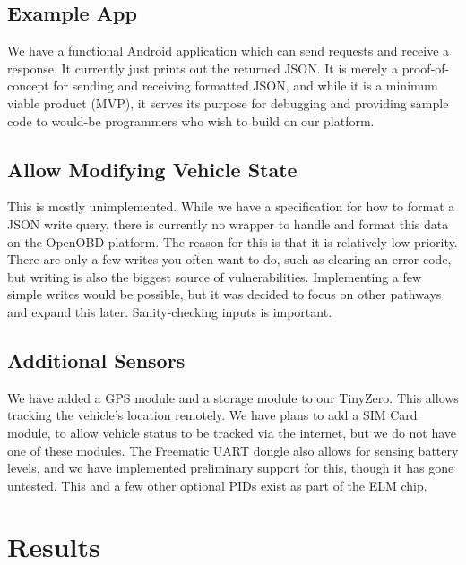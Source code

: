 \documentclass[10pt,letterpaper,unboxed,cm]{article}
\begin{document}
\subsection{Example App}

We have a functional Android application which can send requests and receive a response. It currently just prints out the returned JSON. It is merely a proof-of-concept for sending and receiving formatted JSON, and while it is a minimum viable product (MVP), it serves its purpose for debugging and providing sample code to would-be programmers who wish to build on our platform.

\subsection{Allow Modifying Vehicle State}

This is mostly unimplemented. While we have a specification for how to format a JSON write query, there is currently no wrapper to handle and format this data on the OpenOBD platform. The reason for this is that it is relatively low-priority. There are only a few writes you often want to do, such as clearing an error code, but writing is also the biggest source of vulnerabilities. Implementing a few simple writes would be possible, but it was decided to focus on other pathways and expand this later. Sanity-checking inputs is important.

\subsection{Additional Sensors}

We have added a GPS module and a storage module to our TinyZero. This allows tracking the vehicle's location remotely. We have plans to add a SIM Card module, to allow vehicle status to be tracked via the internet, but we do not have one of these modules. The Freematic UART dongle also allows for sensing battery levels, and we have implemented preliminary support for this, though it has gone untested. This and a few other optional PIDs exist as part of the ELM chip.

\section{Results}
\end{document}
